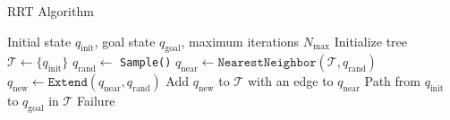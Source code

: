 \begin{algorithm}[H]
\caption{RRT Algorithm}
\label{alg:rrt}
\begin{algorithmic}[1]
\Require Initial state $q_\text{init}$, goal state $q_\text{goal}$, maximum iterations $N_\text{max}$
\State Initialize tree $\mathcal{T} \gets \{q_\text{init}\}$
    \State $q_\text{rand} \gets$ \texttt{Sample()} 
    \State $q_\text{near} \gets \texttt{NearestNeighbor}(\mathcal{T}, q_\text{rand})$ 
    \State $q_\text{new} \gets \texttt{Extend}(q_\text{near}, q_\text{rand})$ 
        \State Add $q_\text{new}$ to $\mathcal{T}$ with an edge to $q_\text{near}$
    \EndIf
        \State \Return Path from $q_\text{init}$ to $q_\text{goal}$ in $\mathcal{T}$
    \EndIf
\EndFor
\State \Return Failure
\end{algorithmic}
\end{algorithm}